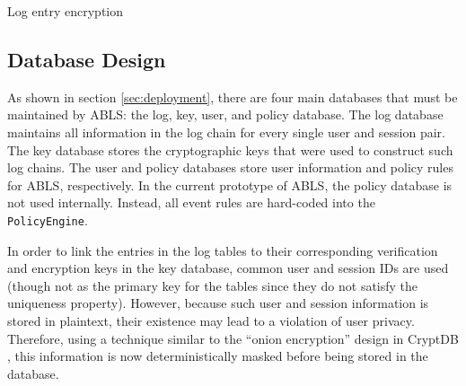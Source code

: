 \documentclass{sig-alternate}
\begin{document}
\begin{algorithm}[ht!] %
\caption{Log entry encryption} \label{alg:encrypt}
\begin{algorithmic}[1]

\ELSE
\ENDIF
{}
\end{algorithmic}
\end{algorithm}

\subsection{Database Design}
\label{sec:databaseDesign}


As shown in section \ref{sec:deployment}, there are four main databases that must be maintained by ABLS:
the log, key, user, and policy database. The log database maintains all information in the log chain for every 
single user and session pair. The key database stores the cryptographic keys that were used to construct
such log chains. The user and policy databases store user information and policy rules for ABLS, respectively. 
In the current prototype of ABLS, the policy database is not used internally. Instead, all event rules are 
hard-coded into the {\tt PolicyEngine}. 

In order to link the entries in the log tables to their corresponding verification and encryption keys in the key database,
common user and session IDs are used (though not as the primary key for the tables since they do not satisfy
the uniqueness property). However, because such user and session information is stored in plaintext, their 
existence may lead to a violation of user privacy. Therefore, using a technique similar to the ``onion encryption'' design in
CryptDB \cite{Popa2012-CryptDB}, this information is now deterministically masked before being stored in the database.
\end{document}

